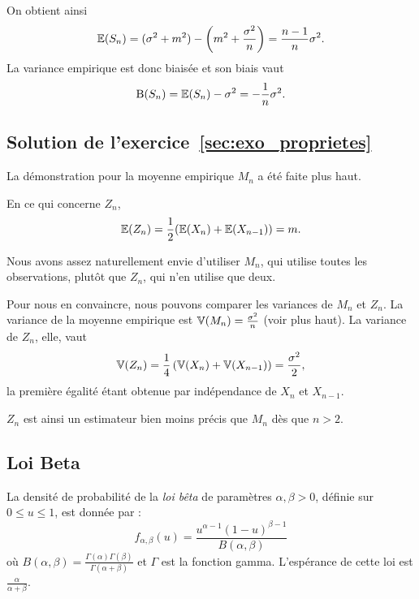 On obtient ainsi 
\[
  \mathbb{E}(S_n) = (\sigma^2 + m^2) - \left(m^2 + \frac{\sigma^2}{n}\right) = \frac{n-1}{n} \sigma^2.
\]
La variance empirique est donc biaisée et son biais vaut 
\[
  \text{B}(S_n) = \mathbb{E}(S_n) - \sigma^2 = - \frac1n \sigma^2.
\]

\subsection{Solution de l'exercice~\ref{sec:exo_proprietes}}
\label{sec:sol_proprietes}
La démonstration pour la moyenne empirique $M_n$ a été faite plus haut.

En ce qui concerne $Z_n$, 
\[
  \mathbb{E}(Z_n) = \frac12 (\mathbb{E}(X_n) + \mathbb{E}(X_{n-1})) = m.
\]

Nous avons assez naturellement envie d'utiliser $M_n$, qui utilise toutes les
observations, plutôt que $Z_n$, qui n'en utilise que deux.

Pour nous en convaincre, nous pouvons comparer les variances de $M_n$ et
$Z_n$. La variance de la moyenne empirique est $\mathbb{V}(M_n) = \frac{\sigma^2}{n}$
(voir plus haut). La variance de $Z_n$, elle, vaut
\[
  \mathbb{V}(Z_n) = \frac14 \left( \mathbb{V}(X_n) + \mathbb{V}(X_{n-1}) \right) = \frac{\sigma^2}{2},
\]
la première égalité étant obtenue par indépendance de $X_n$ et $X_{n-1}$.

$Z_n$ est ainsi un estimateur bien moins précis que $M_n$ dès que $n>2.$

\subsection{Loi Beta}
\label{sec:loi_beta}
La densité de probabilité de la {\it loi bêta} de paramètres
$\alpha, \beta > 0$, définie sur $0 \leq u \leq 1$, est donnée par :
\begin{equation}
  \label{eq:beta_distribution}
  f_{\alpha, \beta} (u) = \frac{u^{\alpha -1} (1-u)^{\beta-1}}{B(\alpha, \beta)}     
\end{equation}
où
$B(\alpha, \beta) = \frac{\Gamma(\alpha) \Gamma(\beta)}{\Gamma(\alpha+\beta)}$
et $\Gamma$ est la fonction gamma. L'espérance de cette loi est
$\frac{\alpha}{\alpha + \beta}$.

